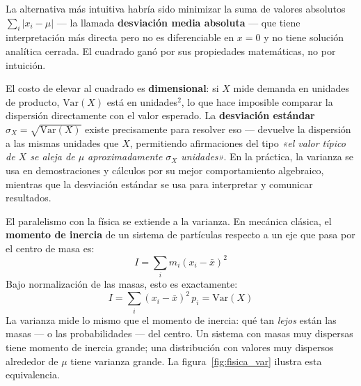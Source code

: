 \documentclass[12pt, a4paper]{book}
\numberwithin{equation}{chapter}
\begin{document}
La alternativa más intuitiva habría sido minimizar la suma de valores 
absolutos $\sum_i |x_i - \mu|$ — la llamada \textbf{desviación media 
	absoluta} — que tiene interpretación más directa pero no es 
diferenciable en $x = 0$ y no tiene solución analítica cerrada. 
El cuadrado ganó por sus propiedades matemáticas, no por intuición.

El costo de elevar al cuadrado es \textbf{dimensional}: si $X$ mide 
demanda en unidades de producto, $\text{Var}(X)$ está en 
unidades$^2$, lo que hace imposible comparar la dispersión 
directamente con el valor esperado. La \textbf{desviación estándar} 
$\sigma_X = \sqrt{\text{Var}(X)}$ existe precisamente para resolver 
eso — devuelve la dispersión a las mismas unidades que $X$, 
permitiendo afirmaciones del tipo \textit{«el valor típico de $X$ 
	se aleja de $\mu$ aproximadamente $\sigma_X$ unidades»}. En la 
práctica, la varianza se usa en demostraciones y cálculos por su 
mejor comportamiento algebraico, mientras que la desviación estándar 
se usa para interpretar y comunicar resultados.

El paralelismo con la física se extiende a la varianza. En mecánica 
clásica, el \textbf{momento de inercia} de un sistema de partículas 
respecto a un eje que pasa por el centro de masa es:
\[
I = \sum_i m_i (x_i - \bar{x})^2
\]
Bajo normalización de las masas, esto es exactamente:
\[
I = \sum_i (x_i - \bar{x})^2\, p_i = \text{Var}(X)
\]
La varianza mide lo mismo que el momento de inercia: qué tan 
\textit{lejos} están las masas — o las probabilidades — del centro. 
Un sistema con masas muy dispersas tiene momento de inercia grande; 
una distribución con valores muy dispersos alrededor de $\mu$ tiene 
varianza grande. La figura~\ref{fig:fisica_var} ilustra esta 
equivalencia.
\end{document}
